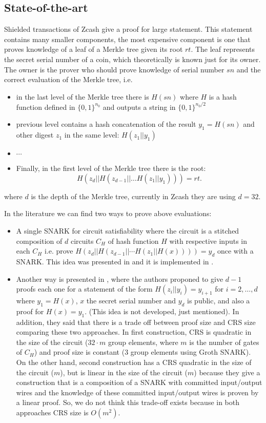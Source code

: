\subsection{State-of-the-art}

Shielded transactions of Zcash give a proof for large statement. This statement contains many smaller components, the most expensive component is one that proves knowledge of a leaf of a Merkle tree given its root $rt$. The leaf represents the secret serial number of a coin, which theoretically is known just for its owner. The owner is the prover who should prove knowledge of serial number $sn$ and the correct evaluation of the Merkle tree, i.e.
\begin{itemize}
	\item in the last level of the Merkle tree there is $H(sn)$ where $H$ is a hash function defined in $\{0,1\}^{n_0}$ and outputs a string in $\{0,1\}^{n_0/2}$
	\item previous level contains a hash concatenation of the result $y_1=H(sn)$ and other digest $z_1$ in the same level: $H(z_1||y_1)$
	\item $\cdots$
	\item Finally, in the first level of the Merkle tree there is the root: 
	$$H(z_{d} || H(z_{d-1} || \dots H(z_1||y_1))) = rt.$$
\end{itemize}
where $d$ is the depth of the Merkle tree, currently in Zcash they are using $d=32$.

In the literature we can find two ways to prove above evaluations:
\begin{itemize}
	\item A single SNARK for circuit satisfiability where the circuit is a stitched composition of $d$ circuits $C_H$ of hash function $H$ with respective inputs in each $C_H$ i.e. prove $H(z_{d}||H(z_{d-1}|| \cdots H(z_1||H(x))))=y_d$ once with a SNARK. This idea was presented in \cite{SP:BCGGMT14} and it is implemented in \cite{zcash}.
	\item Another way is presented in \cite{C:AgrGanMoh18}, where the authors proponed to give $d-1$ proofs each one for a statement of the form $H(z_i||y_i)=y_{i+1}$ for $i=2,\dots,d$ where $y_1=H(x)$, $x$ the secret serial number and $y_{d}$ is public, and also a proof for $H(x)=y_1$. (This idea is not developed, just mentioned). In addition, they said that there is a trade off between proof size and CRS size comparing these two approaches. In first construction, CRS is quadratic in the size of the circuit ($32\cdot m$ group elements, where $m$ is the number of gates of $C_H$) and proof size is constant (3 group elements using Groth SNARK). On the other hand, second construction has a CRS quadratic in the size of the circuit ($m$), but is linear in the size of the circuit ($m$) because they give a construction that is a composition of a SNARK with committed input/output wires and the knowledge of these committed input/output wires is proven by a linear proof. So, we do not think this trade-off exists because in both approaches CRS size is $O(m^2)$.	
\end{itemize}


